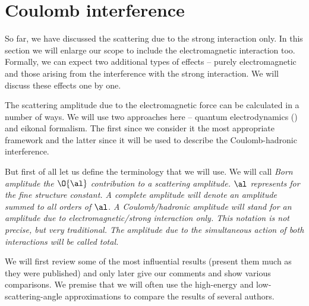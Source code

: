 \section[el coulomb]{Coulomb interference}

So far, we have discussed the scattering due to the strong interaction only. In this section we will enlarge our scope to include the electromagnetic interaction too. Formally, we can expect two additional types of effects -- purely electromagnetic and those arising from the interference with the strong interaction. We will discuss these effects one by one.

The scattering amplitude due to the electromagnetic force can be calculated in a number of ways. We will use two approaches here -- quantum electrodynamics () and eikonal formalism. The first since we consider it the most appropriate framework and the latter since it will be used to describe the Coulomb-hadronic interference.

But first of all let us define the terminology that we will use. We will call \em{Born amplitude} the $\O{\al}$ contribution to a scattering amplitude. $\al$ represents for the fine structure constant. A \em{complete} amplitude will denote an amplitude summed to all orders of $\al$. A \em{Coulomb}/\em{hadronic} amplitude will stand for an amplitude due to electromagnetic/strong interaction only. This notation is not precise, but very traditional. The amplitude due to the simultaneous action of both interactions will be called \em{total}.

We will first review some of the most influential results (present them much as they were published) and only later give our comments and show various comparisons. We premise that we will often use the high-energy and low-scattering-angle approximations to compare the results of several authors.



